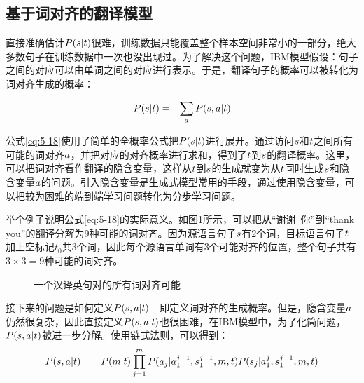 
\subsection{基于词对齐的翻译模型}

\parinterval 直接准确估计${P}({s}|{t})$很难，训练数据只能覆盖整个样本空间非常小的一部分，绝大多数句子在训练数据中一次也没出现过。为了解决这个问题，IBM模型假设：句子之间的对应可以由单词之间的对应进行表示。于是，翻译句子的概率可以被转化为词对齐生成的概率：

\begin{eqnarray}
{P}({s}|{t})&=& \sum_{{a}}{P}({s},{a}|{t})
\label{eq:5-18}
\end{eqnarray}

\parinterval 公式\eqref{eq:5-18}使用了简单的全概率公式把${P}({s}|{t})$进行展开。通过访问${s}$和${t}$之间所有可能的词对齐${a}$，并把对应的对齐概率进行求和，得到了${t}$到${s}$的翻译概率。这里，可以把词对齐看作翻译的隐含变量，这样从${t}$到${s}$的生成就变为从${t}$同时生成${s}$和隐含变量${a}$的问题。引入隐含变量是生成式模型常用的手段，通过使用隐含变量，可以把较为困难的端到端学习问题转化为分步学习问题。

\parinterval 举个例子说明公式\eqref{eq:5-18}的实际意义。如图\ref{fig:5-17}所示，可以把从“谢谢\ 你”到“thank you”的翻译分解为9种可能的词对齐。因为源语言句子${s}$有2个词，目标语言句子${t}$加上空标记$t_0$共3个词，因此每个源语言单词有3个可能对齐的位置，整个句子共有$3\times3=9$种可能的词对齐。

\begin{figure}[htp]
    \centering

    \caption{一个汉译英句对的所有词对齐可能}
    \label{fig:5-17}
\end{figure}

\parinterval 接下来的问题是如何定义${P}({s},{a}|{t})$\ \dash \ 即定义词对齐的生成概率。但是，隐含变量${a}$仍然很复杂，因此直接定义${P}({s},{a}|{t})$也很困难，在IBM模型中，为了化简问题，${P}({s},{a}|{t})$被进一步分解。使用链式法则，可以得到：
\begin{eqnarray}
{P}({s},{a}|{t})&=&{P}(m|{t})\prod_{j=1}^{m}{{P}(a_j|{a}{}_1^{j-1},{s}{}_1^{j-1},m,{t}){P}(s_j|{a}{}_1^{j},{s}{}_1^{j-1},m,{t})}
\label{eq:5-19}
\end{eqnarray}

